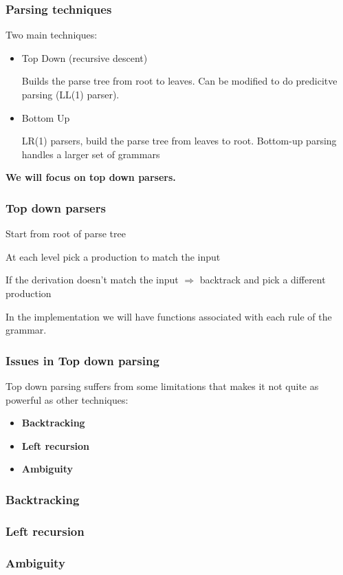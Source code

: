 \begin{frame}
    \frametitle{Parsing techniques}
    Two main techniques:
    \begin{itemize}
        \item Top Down (recursive descent)
        
        Builds the parse tree from root to leaves. 
        Can be modified to do predicitve parsing (LL(1) parser).
        \item Bottom Up
        
        LR(1) parsers, build the parse tree from leaves to root. Bottom-up parsing handles a larger set of
        grammars
    \end{itemize}
   
    \textbf{We will focus on top down parsers.}
\end{frame}
\begin{frame}
    \frametitle{Top down parsers}
    \begin{block}{}Start from root of parse tree \end{block}
    \begin{block}{}At each level pick a production to match the input\end{block}
    \begin{block}{}If the derivation doesn't match the input $\Rightarrow$ backtrack and pick a different production\end{block}
    \begin{block}{}In the implementation  we will have functions associated with each rule of the grammar.\end{block}
\end{frame}

\begin{frame}
    \frametitle{Issues in Top down parsing}
    Top down parsing suffers from some limitations that makes it not quite as powerful as other techniques:\begin{itemize}
        \item \textbf{Backtracking}
        \item \textbf{Left recursion}
        \item \textbf{Ambiguity}
    \end{itemize}
\end{frame}
\begin{frame}
    \frametitle{Backtracking}
\end{frame}
\begin{frame}
    \frametitle{Left recursion}
\end{frame}
\begin{frame}
    \frametitle{Ambiguity}
\end{frame}
